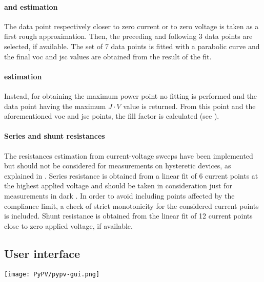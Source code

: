 				\paragraph{ and  estimation}
				The data point respectively closer to zero current or to zero voltage is taken as a first rough approximation.
				Then, the preceding and following 3 data points are selected, if available.
				The set of 7 data points is fitted with a parabolic curve and the final \gls{voc} and \gls{jsc} values are obtained from the result of the fit.
				
				\paragraph{ estimation}
				Instead, for obtaining the maximum power point no fitting is performed and the data point having the maximum $J\cdot V$ value is returned.
				From this point and the aforementioned \gls{voc} and \gls{jsc} points, the fill factor is calculated (see ).
				
				\paragraph{Series and shunt resistances}
				The resistances estimation from current\hyp{}voltage sweeps have been implemented but should not be considered for measurements on hysteretic devices, as explained in .
				Series resistance is obtained from a linear fit of 6 current points at the highest applied voltage and should be taken in consideration just for measurements in dark \cite{Pysch2007}.
				In order to avoid including points affected by the compliance limit, a check of strict monotonicity for the considered current points is included.
				Shunt resistance is obtained from the linear fit of 12 current points close to zero applied voltage, if available.
				
				
		\subsection{User interface}
		
		\begin{sidewaysfigure}
								\centering
			\texttt{[image: PyPV/pypv-gui.png]}
			\label{fig:pypv-gui}
		\end{sidewaysfigure}

